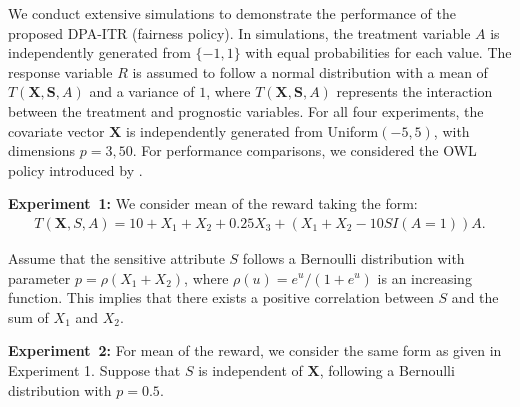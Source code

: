 \documentclass[12pt]{article}
\theoremstyle{plain}
\theoremstyle{definition}
\theoremstyle{remark}
\begin{document}
We conduct extensive simulations to demonstrate the performance of the proposed DPA-ITR (fairness policy). In simulations, the treatment variable $A$ is independently generated from $\{-1,1\}$ with equal probabilities for each value. The response variable $R$ is assumed to follow a normal distribution with a mean of $T(\boldsymbol{X}, \boldsymbol{S},A)$ and a variance of $1$, where $T(\boldsymbol{X}, \boldsymbol{S},A)$ represents the interaction between the treatment and prognostic variables. For all four experiments, the covariate vector $\boldsymbol{X}$ is independently generated from Uniform$(-5,5)$, with dimensions $p=3,50$. For performance comparisons, we considered the OWL policy introduced by \cite{zhao2012estimating}.


\noindent\textbf{Experiment\ 1:}
We consider mean of the reward taking the form:
\begin{equation*}
\begin{aligned}
T(\boldsymbol{X}, S,A)=10+ X_1+X_2+0.25 X_3+\left(X_1+X_2-10SI(A=1)\right)A.
\end{aligned}
\end{equation*}


Assume that the sensitive attribute $S$ follows a Bernoulli distribution with parameter $p=\rho(X_1+X_2)$, where $\rho(u)=e^{u}/(1+e^u)$ is an increasing function. This implies that there exists a positive correlation between $S$ and the sum of $X_1$ and $X_2$.


\noindent\textbf{Experiment\ 2:}
For mean of the reward, we consider the same form as given in Experiment 1. Suppose that $S$ is independent of $\boldsymbol{X}$, following a Bernoulli distribution with $p=0.5$. %


\end{document}
